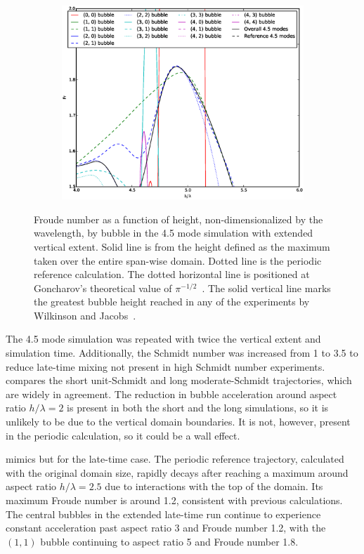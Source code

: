 \begin{figure}
\begin{subfigure}[b]{0.32\textwidth}
  \includegraphics[width=\textwidth]{plts/Fr_long_walls_zoom2}
\end{subfigure}
\caption{ 
Froude number as a function of height, non-dimensionalized by the wavelength, by bubble in the 4.5 mode simulation with extended vertical extent.
Solid line is from the height defined as the maximum taken over the entire span-wise domain.
Dotted line is the periodic reference calculation.
The dotted horizontal line is positioned at Goncharov's theoretical value of $\pi^{-1/2}$~\cite{Goncharov2002}.
The solid vertical line marks the greatest bubble height reached in any of the experiments by Wilkinson and Jacobs~\cite{Wilkinson2007}.
}
\end{figure}


The 4.5 mode simulation was repeated with twice the vertical extent and simulation time.
Additionally, the Schmidt number was increased from 1 to 3.5 to reduce late-time mixing not present in high Schmidt number experiments.
 compares the short unit-Schmidt and long moderate-Schmidt trajectories, which are widely in agreement.
The reduction in bubble acceleration around aspect ratio $h/\lambda = 2$ is present in both the short and the long simulations, so it is unlikely to be due to the vertical domain boundaries.
It is not, however, present in the periodic calculation, so it could be a wall effect.

 mimics  but for the late-time case.
The periodic reference trajectory, calculated with the original domain size, rapidly decays after reaching a maximum around aspect ratio $h/\lambda = 2.5$ due to interactions with the top of the domain.
Its maximum Froude number is around 1.2, consistent with previous calculations.
The central bubbles in the extended late-time run continue to experience constant acceleration past aspect ratio 3 and Froude number 1.2, with the $(1,1)$ bubble continuing to aspect ratio 5 and Froude number 1.8.


